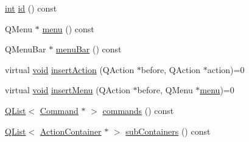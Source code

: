 \begin{DoxyCompactItemize}
\item 
\hyperlink{ioapi_8h_a787fa3cf048117ba7123753c1e74fcd6}{int} \hyperlink{group___core_plugin_ga394d3161befa5e1f84cf07253b21a536}{id} () const 
\item 
Q\-Menu $\ast$ \hyperlink{group___core_plugin_ga243949a2b2abff30862e34f6313f28c0}{menu} () const 
\item 
Q\-Menu\-Bar $\ast$ \hyperlink{group___core_plugin_gaf2d8e7b9ed6b98c22dd1eea1443737ce}{menu\-Bar} () const 
\item 
virtual \hyperlink{group___u_a_v_objects_plugin_ga444cf2ff3f0ecbe028adce838d373f5c}{void} \hyperlink{group___core_plugin_gac4252ea9deafe98c0e98946dfff78b4d}{insert\-Action} (Q\-Action $\ast$before, Q\-Action $\ast$action)=0
\item 
virtual \hyperlink{group___u_a_v_objects_plugin_ga444cf2ff3f0ecbe028adce838d373f5c}{void} \hyperlink{group___core_plugin_gacc8f86cfc70affa3f17dd0998c9e893b}{insert\-Menu} (Q\-Action $\ast$before, Q\-Menu $\ast$\hyperlink{group___core_plugin_ga243949a2b2abff30862e34f6313f28c0}{menu})=0
\item 
\hyperlink{class_q_list}{Q\-List}$<$ \hyperlink{class_core_1_1_command}{Command} $\ast$ $>$ \hyperlink{group___core_plugin_gab3e0ff04d294ddefd25b8762d3e2f008}{commands} () const 
\item 
\hyperlink{class_q_list}{Q\-List}$<$ \hyperlink{class_core_1_1_action_container}{Action\-Container} $\ast$ $>$ \hyperlink{group___core_plugin_ga63f59fe25c7e6fa20891fca2ee620f16}{sub\-Containers} () const 
\end{DoxyCompactItemize}
